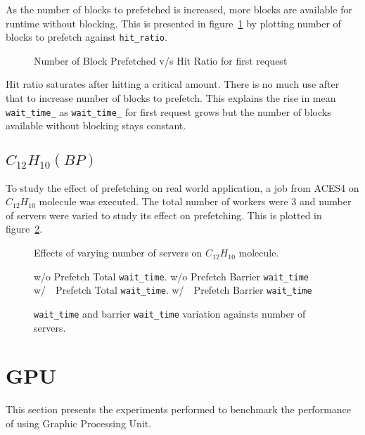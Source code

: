 As the number of blocks to prefetched is increased, more blocks are available for
runtime without blocking. This is presented in figure~\ref{fig:look_ahead_hit_ratio}
by plotting number of blocks to prefetch against \texttt{hit\_ratio}.

\begin{figure}[h]
  
  \caption{Number of Block Prefetched v/s Hit Ratio for first request}
  \label{fig:look_ahead_hit_ratio}
\end{figure}

Hit ratio saturates after hitting a critical amount. There is no much use after
that to increase number of blocks to prefetch. This explains the rise in mean
\texttt{wait\_time\_} as \texttt{wait\_time\_} for first request grows but the
number of blocks available without blocking stays constant.

\subsection{$C_{12}H_{10}(BP)$}
To study the effect of prefetching on real world application, a job from ACES4 on
$C_{12}H_{10}$ molecule was executed. The total number of workers were 3 and number
of servers were varied to study its effect on prefetching. This is plotted in
figure~\ref{fig:prefetch_real}.

\begin{figure}[h]
  
  \caption{Effects of varying number of servers on $C_{12}H_{10}$ molecule.}
  \label{fig:prefetch_real}
\end{figure}

\begin{figure}[h]
  
   w/o Prefetch Total \texttt{wait\_time}.
   w/o Prefetch Barrier \texttt{wait\_time}
  \\
   w/~~Prefetch Total \texttt{wait\_time}.
    w/~~Prefetch Barrier \texttt{wait\_time}
  \caption{\texttt{wait\_time} and barrier \texttt{wait\_time} variation againsts number of servers.}
  \label{fig:prefetch_real_barrier}
\end{figure}
\section{GPU}
This section presents the experiments performed to benchmark the performance of
using Graphic Processing Unit.
